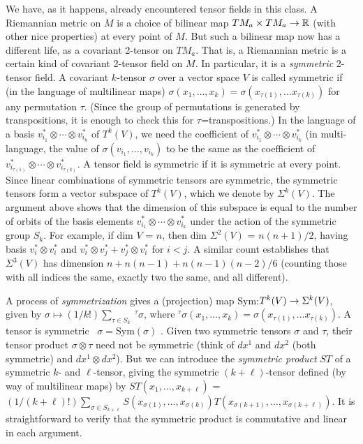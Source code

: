 We have, as it happens, already encountered tensor fields in this class. A
Riemannian metric on $M$ is a choice of bilinear map $TM_a\times TM_a\rightarrow {\Bbb R}$
(with other nice properties) at every point of $M$. But such a bilinear map
now has a different life, as a covariant 2-tensor on $TM_a$. That is, a
Riemannian metric is a certain kind of covariant 2-tensor field on $M$.
In particular, it is a {\it symmetric} 2-tensor field. A covariant 
$k$-tensor $\sigma$ over a vector space $V$ is called symmetric if 
(in the language of multilinear maps)
$\sigma(x_1,\ldots ,x_k)=\sigma(x_{\tau(1)},\ldots x_{\tau(k)})$ for any permutation
$\tau$. (Since the group of permutations is generated by transpositions,
it is enough to check this for $\tau$=transpositions.) 
In the language of a basis $v_{i_1}^*\otimes\cdots\otimes v_{i_k}^*$ of
$T^k(V)$, we need the coefficient of $v_{i_1}^*\otimes\cdots\otimes v_{i_k}^*$
(in multi-language, the value of $\sigma(v_{i_1},\ldots,v_{i_k})$
to be the same as the coefficient of $v_{i_{\tau(1)}}^*\otimes\cdots\otimes v_{i_{\tau(k)}}^*$.
A tensor field is symmetric 
if it is symmetric at every point. Since linear combinations of symmetric
tensors are symmetric, the symmetric tensors form a vector subspace of $T^k(V)$,
which we denote by $\Sigma^k(V)$. The argument above shows that the dimension
of this subspace is equal to the number of orbits of 
the basis elements $v_{i_1}^*\otimes\cdots\otimes v_{i_k}^*$ under the action of
the symmetric group $S_k$. For example, if dim $V$ = $n$, then dim $\Sigma^2(V)$ = $n(n+1)/2$,
having basis $v_i^*\otimes v_i^*$ and $v_i^*\otimes v_j^*+v_j^*\otimes v_i^*$ for $i<j$.
A similar count establishes that $\Sigma^3(V)$ has dimension $n+n(n-1)+n(n-1)(n-2)/6$
(counting those with all indices the same, exactly two the same, and all different).

A process of {\it symmetrization} gives a 
(projection) map Sym:$T^k(V)\rightarrow \Sigma^k(V)$, given by 
$\sigma\mapsto (1/k!)\sum_{\tau\in S_k}\ ^\tau\sigma$, where 
$^\tau\sigma(x_1,\ldots ,x_k)=\sigma(x_{\tau(1)},\ldots x_{\tau(k)})$.
A tensor is symmetric \lra\ $\sigma=$Sym$(\sigma)$ . Given two symmetric tensors $\sigma$ and $\tau$,
their tensor product $\sigma\otimes\tau$ need not be symmetric (think of $dx^1$ and $dx^2$ (both symmetric)
and $dx^1\otimes dx^2$). But we can introduce the {\it symmetric product} $ST$ of a
symmetric $k$- and $\ell$-tensor, giving the symmetric $(k+\ell)$-tensor defined 
(by way of multilinear maps) by $ST(x_1,\ldots, x_{k+\ell})$ = 
$(1/(k+\ell)!)\sum_{\sigma\in S_{k+\ell}}S(x_{\sigma(1)},\ldots,x_{\sigma(k)})T(x_{\sigma(k+1)},\ldots,
x_{\sigma(k+\ell)})$. It is straightforward to verify that the symmetric product is commutative
and linear in each argument.

